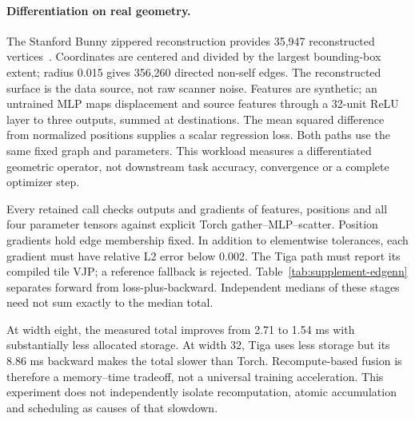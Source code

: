 \paragraph{Differentiation on real geometry.}
The Stanford Bunny zippered reconstruction provides 35,947 reconstructed
vertices~\cite{stanfordbunny}. Coordinates are centered and divided by the largest
bounding-box extent; radius 0.015 gives 356,260 directed non-self edges. The
reconstructed surface is the data source, not raw scanner noise. Features are
synthetic; an untrained MLP maps displacement and source features through a
32-unit ReLU layer to three outputs, summed at destinations. The mean squared
difference from normalized positions supplies a scalar regression loss.
Both paths use the same fixed graph and parameters. This workload measures a
differentiated geometric operator, not downstream task accuracy, convergence
or a complete optimizer step.

Every retained call checks outputs and gradients of features, positions and
all four parameter tensors against explicit Torch gather--MLP--scatter.
Position gradients hold edge membership fixed. In addition to elementwise
tolerances, each gradient must have relative L2 error below 0.002. The Tiga
path must report its compiled tile VJP; a reference fallback is rejected.
Table~\ref{tab:supplement-edgenn} separates forward from loss-plus-backward.
Independent medians of these stages need not sum exactly to the median total.

\begin{table}[htbp]
\centering\small

\caption{Bunny EdgeNN: medians across three process medians. Peak allocation is
the median of per-process measured peaks. Backward includes loss construction;
no optimizer update is timed.}
\label{tab:supplement-edgenn}
\end{table}

At width eight, the measured total improves from 2.71 to 1.54 ms with substantially
less allocated storage. At width 32, Tiga uses less storage but its 8.86 ms
backward makes the total slower than Torch. Recompute-based fusion is therefore
a memory--time tradeoff, not a universal training acceleration. This experiment
does not independently isolate recomputation, atomic accumulation and scheduling
as causes of that slowdown.


